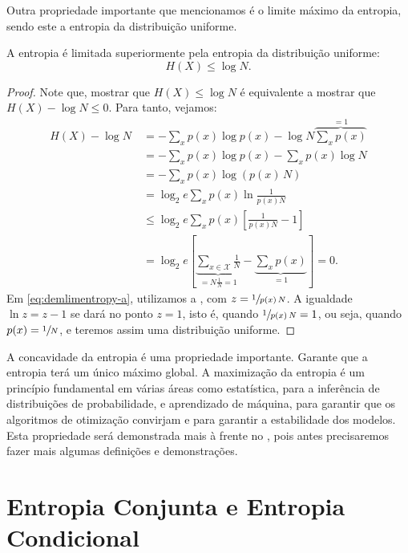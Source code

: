 Outra propriedade importante que mencionamos é o limite máximo da entropia,
sendo este a entropia da distribuição uniforme.
\begin{theorem}
A entropia é limitada superiormente pela entropia da distribuição uniforme:
  \begin{equation}
    H(X) \leq \log N .
  \end{equation}
\end{theorem}
\begin{proof}
Note que, mostrar que $H(X) \leq \log N$
é equivalente a mostrar que $H(X) - \log N \leq 0$. Para tanto, vejamos:
\begin{subequations}\label{eq:demlimentropy}
\begin{align}
H(X) - \log N \: &= - \sum_x p(x) \log p(x)  - \log N \overbrace{\sum_x p(x)}^{=1} \\
    &= - \sum_x p(x) \log p(x) - \sum_x p(x) \log N \\
    &= - \sum_x p(x) \log \left(p(x) \, N\right) \\
    &= \log_2 e \sum_x p(x) \ln \frac{1}{p(x) N} \\
    &\leq \log_2 e \sum_x p(x) \left[ \frac{1}{p(x) N} -1 \right] \label{eq:demlimentropy-a}\\
    &= \log_2 e \left[ \underbrace{\sum_{x \in \mathcal{X}} \frac{1}{N}}_{= N \frac{1}{N} = 1} - \underbrace{\sum_x p(x)}_{=1} \right] = 0.
\end{align}
\end{subequations}
Em \ref{eq:demlimentropy-a}, utilizamos a , com $z = \sfrac{1}{p(x) \, N}$.
A igualdade $\ln z = z-1$ se dará no ponto $z = 1$, isto é, quando $\sfrac{1}{p(x) \, N} = 1$, ou seja,
quando $p(x) = \sfrac{1}{N}$, e teremos assim uma distribuição uniforme.
\end{proof}

A concavidade da entropia é uma propriedade importante. Garante que a entropia
terá um único máximo global. A maximização da entropia é um princípio
fundamental em várias áreas como estatística, para a inferência de
distribuições de probabilidade, e aprendizado de máquina, para garantir que os
algoritmos de otimização convirjam e para garantir a estabilidade dos modelos.
Esta propriedade será demonstrada mais à frente no ,
pois antes precisaremos fazer mais algumas definições e demonstrações.



\section{Entropia Conjunta e Entropia Condicional}\label{sec:entropiaconjunta}

